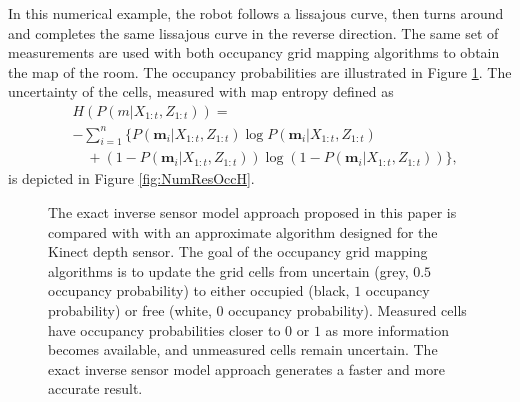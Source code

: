 \documentclass[letterpaper, 10pt, conference]{ieeeconf}
\begin{document}
In this numerical example, the robot follows a lissajous curve, then turns around and completes the same lissajous curve in the reverse direction.
The same set of measurements are used with both occupancy grid mapping algorithms to obtain the map of the room.
The occupancy probabilities are illustrated in Figure \ref{fig:NumResOccProbs}. The uncertainty of the cells, measured with map entropy defined as
\begin{align}
&H(P(m|X_{1:t},Z_{1:t}))=\nonumber\\&-\sum_{i=1}^n\bigg\{P(\mathbf{m}_i|X_{1:t},Z_{1:t})\log P(\mathbf{m}_i|X_{1:t},Z_{1:t})\nonumber\\&\quad+(1-P(\mathbf{m}_i|X_{1:t},Z_{1:t}))\log(1-P(\mathbf{m}_i|X_{1:t},Z_{1:t}))\bigg\},
\end{align}
is depicted in Figure \ref{fig:NumResOccH}.

\begin{figure}[h]
\label{fig:NumResOccProbs}
\centerline{
}
\centerline{
}
\centerline{
}
\centerline{
}
\centerline{
}
\caption{The exact inverse sensor model approach proposed in this paper is compared with with an approximate algorithm designed for the Kinect depth sensor. The goal of the occupancy grid mapping algorithms is to update the grid cells from uncertain (grey, $0.5$ occupancy probability) to either occupied (black, $1$ occupancy probability) or free (white, $0$ occupancy probability). Measured cells have occupancy probabilities closer to $0$ or $1$ as more information becomes available, and unmeasured cells remain uncertain. The exact inverse sensor model approach generates a faster and more accurate result.}
\end{figure}
\end{document}
